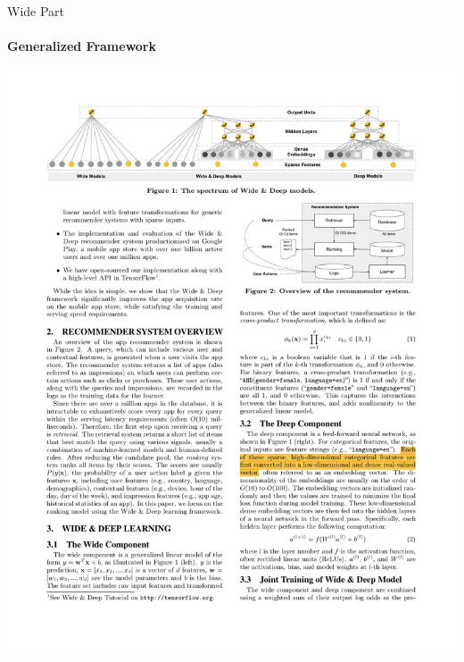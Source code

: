 \documentclass{ctexbeamer}
\begin{document}
\begin{frame}{Wide Part}
	\framesubtitle{Generalized Framework}
	\begin{center}
		\includegraphics[width=\textwidth]{framework/wide}
	\end{center}
\end{frame}
\end{document}
